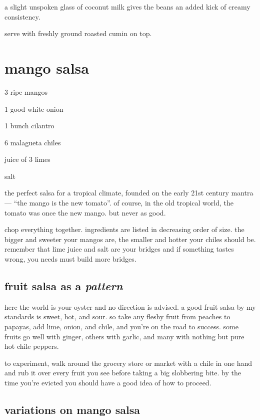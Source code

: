 a slight unspoken glass of coconut milk gives the beans an added kick
of creamy consistency.

serve with freshly ground roasted cumin on top.

\section{mango salsa}

\begin{ingredients}
  \item 3 ripe mangos
  \item 1 good white onion
  \item 1 bunch cilantro
  \item 6 malagueta chiles
  \item juice of 3 limes
  \item salt
\end{ingredients}

the perfect salsa for a tropical climate, founded on the early 21st
century mantra --- ``the mango is the new tomato''. of course, in the
old tropical world, the tomato was once the new mango. but never as
good.

chop everything together. ingredients are listed in decreasing order
of size. the bigger and sweeter your mangos are, the smaller and
hotter your chiles should be. remember that lime juice and salt are
your bridges and if something tastes wrong, you needs must build more
bridges.

\subsection{fruit salsa as a \textit{pattern}}

here the world is your oyster and no direction is advised. a good
fruit salsa by my standards is sweet, hot, and sour. so take any
fleshy fruit from peaches to papayas, add lime, onion, and chile, and
you're on the road to success. some fruits go well with ginger, others
with garlic, and many with nothing but pure hot chile peppers.

to experiment, walk around the grocery store or market with a chile in
one hand and rub it over every fruit you see before taking a big
slobbering bite. by the time you're evicted you should have a good
idea of how to proceed.

\subsection{variations on mango salsa}

